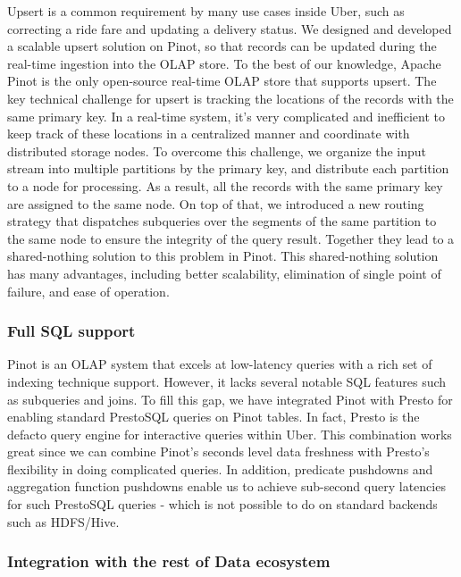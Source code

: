 \documentclass[sigconf]{acmart}
\begin{document}
Upsert is a common requirement by many use cases inside Uber, such as correcting a ride fare and updating a delivery status. We designed and developed a scalable upsert solution on Pinot, so that records can be updated during the real-time ingestion into the OLAP store. To the best of our knowledge, Apache Pinot is the only open-source real-time OLAP store that supports upsert. The key technical challenge for upsert is tracking the locations of the records with the same primary key. In a real-time system, it’s very complicated and inefficient to keep track of these locations in a centralized manner and coordinate with distributed storage nodes. To overcome this challenge, we organize the input stream into multiple partitions by the primary key, and distribute each partition to a node for processing. As a result, all the records with the same primary key are assigned to the same node. On top of that, we introduced a new routing strategy that dispatches subqueries over the segments of the same partition to the same node to ensure the integrity of the query result. Together they lead to a shared-nothing solution to this problem in Pinot. This shared-nothing solution has many advantages, including better scalability, elimination of single point of failure, and ease of operation.

\subsubsection{Full SQL support }

Pinot is an OLAP system that excels at low-latency queries with a rich set of indexing technique support. However, it lacks several notable SQL features such as subqueries and joins. To fill this gap, we have integrated Pinot with Presto for enabling standard PrestoSQL queries on Pinot tables\cite{pinot-sql}. In fact, Presto is the defacto query engine for interactive queries within Uber. This combination works great since we can combine Pinot’s seconds level data freshness with Presto’s flexibility in doing complicated queries. In addition, predicate pushdowns and aggregation function pushdowns enable us to achieve sub-second query latencies for such PrestoSQL queries - which is not possible to do on standard backends such as HDFS/Hive. 

\subsubsection{Integration with the rest of Data ecosystem}
\end{document}
